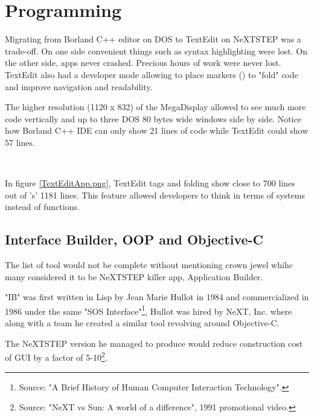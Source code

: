 
\section{Programming}
Migrating from Borland C++ editor on DOS to TextEdit on NeXTSTEP was a trade-off. On one side convenient things such as syntax highlighting were lost. On the other side, apps never crashed. Precious hours of work were never lost. TextEdit also had a developer mode allowing to place markers (\cw{//}) to "fold" code and improve navigation and readability.\\
\par
 The higher resolution (1120 x 832) of the MegaDisplay allowed to see much more code vertically and up to three DOS 80 bytes wide windows side by side. Notice how Borland C++ IDE can only show 21 lines of code while TextEdit could show 57 lines.\\
\par
{}\\

\vspace{-4mm}


In figure \ref{TextEditApp.png}, TextEdit tags and folding show close to 700 lines out of 's' 1181 lines. This feature allowed developers to think in terms of systems instead of functions.

\subsection{Interface Builder, OOP and Objective-C}
The list of tool would not be complete without mentioning \NeXT crown jewel whihc many considered it to be NeXTSTEP killer app, Application Builder.\\
\par
"IB" was first written in Lisp by Jean Marie Hullot in 1984 and commercialized in 1986 under the same "SOS Interface"\footnote{Source: "A Brief History of Human Computer Interaction Technology".}, Hullot was hired by NeXT, Inc. where along with a team he created a similar tool revolving around Objective-C.\\
\par
The NeXTSTEP version he managed to produce would reduce construction cost of GUI by a factor of 5-10\footnote{Source: "NeXT vs Sun: A world of a difference", 1991 promotional video.}.\\
\par
{}



